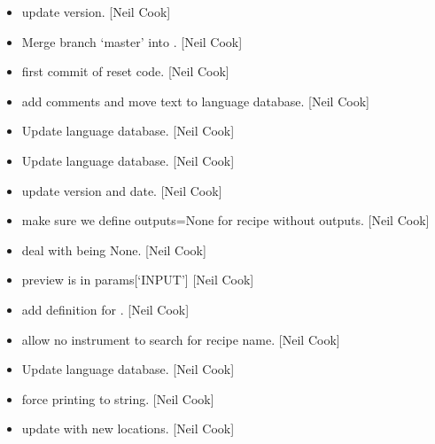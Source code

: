 \documentclass[a4paper,10pt,english]{report}
\begin{document}
\begin{itemize}
\item {} 
 \sphinxhyphen{} update version. {[}Neil Cook{]}

\item {} 
Merge branch ‘master’ into . {[}Neil Cook{]}

\item {} 
 \sphinxhyphen{} first commit of reset code. {[}Neil Cook{]}

\item {} 
 \sphinxhyphen{} add comments and move text to language database.
{[}Neil Cook{]}

\item {} 
Update language database. {[}Neil Cook{]}

\item {} 
Update language database. {[}Neil Cook{]}

\item {} 
 \sphinxhyphen{} update version and date. {[}Neil Cook{]}

\item {} 
 \sphinxhyphen{} make sure we define outputs=None for recipe without
outputs. {[}Neil Cook{]}

\item {} 
 \sphinxhyphen{} deal with  being None. {[}Neil Cook{]}

\item {} 
 \sphinxhyphen{} preview is in params{[}‘INPUT’{]} {[}Neil Cook{]}

\item {} 
 \sphinxhyphen{} add definition for . {[}Neil Cook{]}

\item {} 
 \sphinxhyphen{} allow no instrument to search for recipe name. {[}Neil
Cook{]}

\item {} 
Update language database. {[}Neil Cook{]}

\item {} 
 \sphinxhyphen{} force printing to string. {[}Neil Cook{]}

\item {} 
 \sphinxhyphen{} update with new locations. {[}Neil Cook{]}


\end{itemize}
\end{document}
